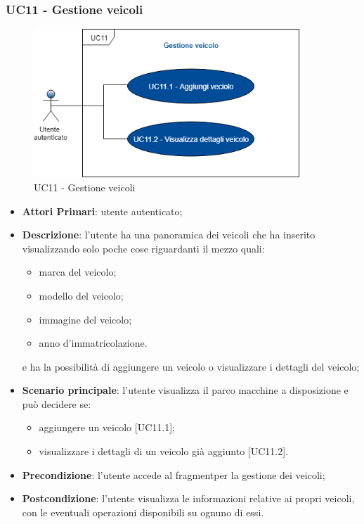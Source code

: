  \subsubsection{UC11 - Gestione veicoli}
  \begin{figure}[H]
 	\includegraphics[width=10cm]{res/images/UC10Gestioneveicolo.png}
 	\centering
 	\caption{UC11 - Gestione veicoli}
 \end{figure}
 \begin{itemize}
 	\item \textbf{Attori Primari}: utente autenticato;
 	\item \textbf{Descrizione}: l'utente ha una panoramica dei veicoli che ha inserito visualizzando solo poche cose riguardanti il mezzo quali:
 	\begin{itemize}
 		\item marca del veicolo;
 		\item modello del veicolo;
 		\item immagine del veicolo;
 		\item anno d'immatricolazione.
 	\end{itemize} 
 	e ha la possibilità di aggiungere un veicolo o visualizzare i dettagli del veicolo;
 	\item \textbf{Scenario principale}: l'utente visualizza il parco macchine a disposizione e può decidere se:
 	\begin{itemize}
 		\item aggiungere un veicolo [UC11.1];
 		\item visualizzare i dettagli di un veicolo già aggiunto [UC11.2].
 	\end{itemize}
 	\item \textbf{Precondizione}: l'utente accede al fragment\glosp per la gestione dei veicoli;
 	\item \textbf{Postcondizione}: l'utente visualizza le informazioni relative ai propri veicoli, con le eventuali operazioni disponibili su ognuno di essi.
 \end{itemize}
